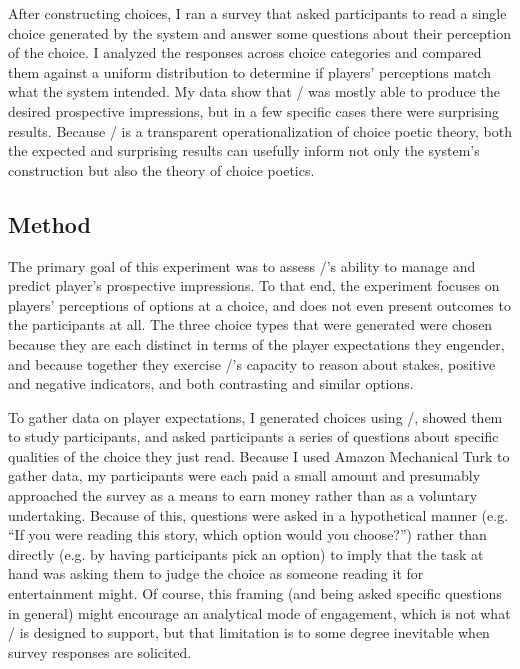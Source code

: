 After constructing choices, I ran a survey that asked participants to read a single choice generated by the system and answer some questions about their perception of the choice.
%
I analyzed the responses across choice categories and compared them against a uniform distribution to determine if players' perceptions match what the system intended.
%
My data show that \dunyazad/ was mostly able to produce the desired prospective impressions, but in a few specific cases there were surprising results.
%
Because \dunyazad/ is a transparent operationalization of choice poetic theory, both the expected and surprising results can usefully inform not only the system's construction but also the theory of choice poetics.


\subsection{Method}

The primary goal of this experiment was to assess \dunyazad/'s ability to manage and predict player's prospective impressions.
%
To that end, the experiment focuses on players' perceptions of options at a choice, and does not even present outcomes to the participants at all.
%
The three choice types that were generated were chosen because they are each distinct in terms of the player expectations they engender, and because together they exercise \dunyazad/'s capacity to reason about stakes, positive and negative indicators, and both contrasting and similar options.


To gather data on player expectations, I generated choices using \dunyazad/, showed them to study participants, and asked participants a series of questions about specific qualities of the choice they just read.
%
Because I used Amazon Mechanical Turk to gather data, my participants were each paid a small amount and presumably approached the survey as a means to earn money rather than as a voluntary undertaking.
%
Because of this, questions were asked in a hypothetical manner (e.g. ``If you were reading this story, which option would you choose?'') rather than directly (e.g. by having participants pick an option) to imply that the task at hand was asking them to judge the choice as someone reading it for entertainment might.
%
Of course, this framing (and being asked specific questions in general) might encourage an analytical mode of engagement, which is not what \dunyazad/ is designed to support, but that limitation is to some degree inevitable when survey responses are solicited.


